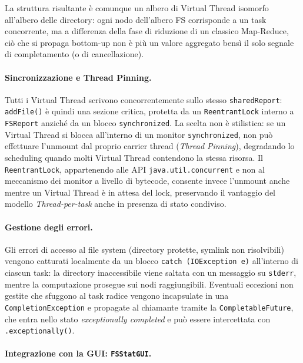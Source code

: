 \documentclass[11pt,a4paper]{article}
\begin{document}
La struttura risultante è comunque un albero di Virtual Thread isomorfo all'albero delle directory: ogni nodo dell'albero FS corrisponde a un task concorrente, ma a differenza della fase di riduzione di un classico Map-Reduce, ciò che si propaga bottom-up non è più un valore aggregato bensì il solo segnale di completamento (o di cancellazione).

\paragraph{Sincronizzazione e Thread Pinning.}

Tutti i Virtual Thread scrivono concorrentemente sullo stesso \texttt{sharedReport}: \texttt{addFile()} è quindi una sezione critica, protetta da un \texttt{ReentrantLock} interno a \texttt{FSReport} anziché da un blocco \texttt{synchronized}. La scelta non è stilistica: se un Virtual Thread si blocca all'interno di un monitor \texttt{synchronized}, non può effettuare l'unmount dal proprio carrier thread (\textit{Thread Pinning}), degradando lo scheduling quando molti Virtual Thread contendono la stessa risorsa. Il \texttt{ReentrantLock}, appartenendo alle API \texttt{java.util.concurrent} e non al meccanismo dei monitor a livello di bytecode, consente invece l'unmount anche mentre un Virtual Thread è in attesa del lock, preservando il vantaggio del modello \textit{Thread-per-task} anche in presenza di stato condiviso.

\paragraph{Gestione degli errori.}

Gli errori di accesso al file system (directory protette, symlink non risolvibili) vengono catturati localmente da un blocco \texttt{catch (IOException e)} all'interno di ciascun task: la directory inaccessibile viene saltata con un messaggio su \texttt{stderr}, mentre la computazione prosegue sui nodi raggiungibili. Eventuali eccezioni non gestite che sfuggono al task radice vengono incapsulate in una \texttt{CompletionException} e propagate al chiamante tramite la \texttt{CompletableFuture}, che entra nello stato \textit{exceptionally completed} e può essere intercettata con \texttt{.exceptionally()}.

\paragraph{Integrazione con la GUI: \texttt{FSStatGUI}.}
\end{document}
